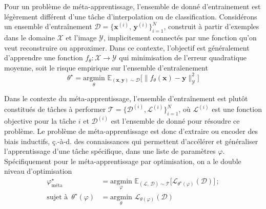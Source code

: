 Pour un problème de méta-apprentissage, l'ensemble de donné d'entrainement est légèrement différent d'une tâche d'interpolation ou de classification. 
Considérons un ensemble d'entraînement $\mathcal{D} = \{\mathbf{x}^{(i)},\,\mathbf{y}^{(i)}\}_{i=1}^{N}$, 
construit à partir d'exemples dans le domaine $\mathcal{X}$ et l'image $\mathcal{Y}$, implicitement connectés par une fonction qu'on veut reconstruire ou 
approximer. Dans ce contexte, l'objectif est généralement d'apprendre une fonction $f_\theta: \mathcal{X} \rightarrow \mathcal{Y}$ 
qui minimisation de l'erreur quadratique moyenne, soit le risque empirique sur l'ensemble d'entraîenement
\begin{equation}\label{eq:Regression}
        \theta^{\star} = \underset{\theta}{\mathrm{argmin}}\,\, 
        \mathbb{E}_{(\mathbf{x},\mathbf{y}) \sim \mathcal{D}} \bigg[ \big\lVert f_\theta(\mathbf{x}) - \mathbf{y} \big\rVert^{2}_{\mathcal{Y}}  \bigg]
\end{equation} 

Dans le contexte du méta-apprentissage, 
l'ensemble d'entraînement est plutôt constitués de tâches à performer $\mathcal{T} = \{\mathcal{D}^{(i)}, \mathcal{L}^{(i)}\}_{i=1}^{N}$, où 
$\mathcal{L}^{(i)}$ est une fonction objective pour la tâche $i$ et $\mathcal{D}^{(i)}$ 
est l'ensemble de donné pour résoudre ce problème. 
Le problème de méta-apprentissage est donc d'extraire ou encoder des biais inductifs, ç.-à-d. des connaissances qui permettent d'accélérer 
et généraliser l'apprentissage d'une tâche spécifique, dans une liste de paramètres $\varphi$. Spécifiquement 
pour le méta-apprentissage par optimisation, on a le double niveau d'optimisation
\begin{equation}\label{eq:meta learning}
        \begin{aligned}
                \varphi^{\star}_{\text{méta}} &= \underset{\varphi}{\mathrm{argmin}}\,\, 
                \mathbb{E}_{(\mathcal{L},\,\mathcal{D}) \sim \mathcal{T}} \bigg[ \mathcal{L}_{\theta^{\star}(\varphi)}(\mathcal{D}) \bigg]\, ; \\[1.5ex]
                \text{sujet à}\,\,\, \theta^{\star }(\varphi) &= \underset{\theta}{\mathrm{argmin}}\,\, \mathcal{L}_{\theta(\varphi)}(\mathcal{D})
        \end{aligned}
\end{equation} 


